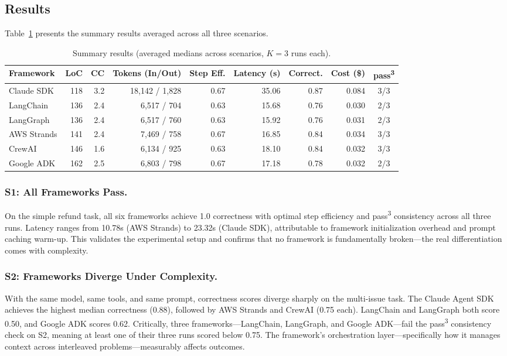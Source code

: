 \documentclass[sigconf]{acmart}
\begin{document}
\subsection{Results}

Table~\ref{tab:results} presents the summary results averaged across all three scenarios.

\begin{table}[t]
  \caption{Summary results (averaged medians across scenarios, $K{=}3$ runs each).}
  \label{tab:results}
  \small
  \begin{tabular}{lrrrrrrrc}
    \toprule
    \textbf{Framework} & \textbf{LoC} & \textbf{CC} & \textbf{Tokens (In/Out)} & \textbf{Step Eff.} & \textbf{Latency (s)} & \textbf{Correct.} & \textbf{Cost (\$)} & \textbf{pass\textsuperscript{3}} \\
    \midrule
    Claude SDK   & 118 & 3.2 & 18{,}142 / 1{,}828 & 0.67 & 35.06 & 0.87 & 0.084 & 3/3 \\
    LangChain    & 136 & 2.4 & 6{,}517 / 704     & 0.63 & 15.68 & 0.76 & 0.030 & 2/3 \\
    LangGraph    & 136 & 2.4 & 6{,}517 / 760     & 0.63 & 15.92 & 0.76 & 0.031 & 2/3 \\
    AWS Strands  & 141 & 2.4 & 7{,}469 / 758     & 0.67 & 16.85 & 0.84 & 0.034 & 3/3 \\
    CrewAI       & 146 & 1.6 & 6{,}134 / 925     & 0.63 & 18.10 & 0.84 & 0.032 & 3/3 \\
    Google ADK   & 162 & 2.5 & 6{,}803 / 798     & 0.67 & 17.18 & 0.78 & 0.032 & 2/3 \\
    \bottomrule
  \end{tabular}
\end{table}

\subsubsection{S1: All Frameworks Pass.}
On the simple refund task, all six frameworks achieve 1.0 correctness with optimal step efficiency and pass\textsuperscript{3} consistency across all three runs. Latency ranges from 10.78s (AWS Strands) to 23.32s (Claude SDK), attributable to framework initialization overhead and prompt caching warm-up. This validates the experimental setup and confirms that no framework is fundamentally broken---the real differentiation comes with complexity.

\subsubsection{S2: Frameworks Diverge Under Complexity.}
With the same model, same tools, and same prompt, correctness scores diverge sharply on the multi-issue task. The Claude Agent SDK achieves the highest median correctness (0.88), followed by AWS Strands and CrewAI (0.75 each). LangChain and LangGraph both score 0.50, and Google ADK scores 0.62. Critically, three frameworks---LangChain, LangGraph, and Google ADK---fail the pass\textsuperscript{3} consistency check on S2, meaning at least one of their three runs scored below 0.75. The framework's orchestration layer---specifically how it manages context across interleaved problems---measurably affects outcomes.
\end{document}
